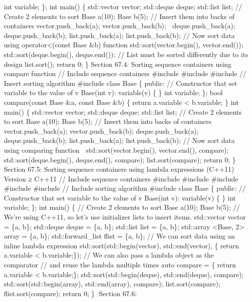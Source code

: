 int variable; \}; int main() \{ std::vector vector; std::deque deque;
std::list list; // Create 2 elements to sort Base a(10); Base b(5); //
Insert them into backs of containers vector.push\_back(a);
vector.push\_back(b);  deque.push\_back(a); deque.push\_back(b);
list.push\_back(a); list.push\_back(b); // Now sort data using
operator\textless(const Base \&b) function std::sort(vector.begin(),
vector.end()); std::sort(deque.begin(), deque.end()); // List must be
sorted differently due to its design list.sort(); return 0; \} Section
67.4: Sorting sequence containers using compare function // Include
sequence containers \#include \#include \#include // Insert sorting
algorithm \#include class Base \{ public: // Constructor that set
variable to the value of v Base(int v): variable(v) \{ \} int variable;
\}; bool compare(const Base \&a, const Base \&b) \{ return a.variable
\textless{} b.variable; \} int main() \{ std::vector vector; std::deque
deque; std::list list; // Create 2 elements to sort Base a(10); Base
b(5); // Insert them into backs of containers vector.push\_back(a);
vector.push\_back(b); deque.push\_back(a); deque.push\_back(b);
list.push\_back(a); list.push\_back(b); // Now sort data using comparing
function  std::sort(vector.begin(), vector.end(), compare);
std::sort(deque.begin(), deque.end(), compare); list.sort(compare);
return 0; \} Section 67.5: Sorting sequence containers using lambda
expressions (C++11) Version ≥ C++11 // Include sequence containers
\#include \#include \#include \#include \#include // Include sorting
algorithm \#include class Base \{ public: // Constructor that set
variable to the value of v Base(int v): variable(v) \{ \} int variable;
\}; int main() \{ // Create 2 elements to sort Base a(10); Base b(5); //
We're using C++11, so let's use initializer lists to insert items.
std::vector vector = \{a, b\}; std::deque deque = \{a, b\}; std::list
list = \{a, b\}; std::array \textless Base, 2\textgreater{} array = \{a,
b\}; std::forward\_list flist = \{a, b\}; // We can sort data using an
inline lambda expression std::sort(std::begin(vector), std::end(vector),
\href{const\%20Base\%20\&a,\%20const\%20Base\%20\&b}{} \{ return
a.variable \textless{} b.variable;\}); // We can also pass a lambda
object as the comparator // and reuse the lambda multiple times auto
compare = \href{const\%20Base\%20\&a,\%20const\%20Base\%20\&b}{} \{
return a.variable \textless{} b.variable;\};
std::sort(std::begin(deque), std::end(deque), compare);
std::sort(std::begin(array), std::end(array), compare);
list.sort(compare); flist.sort(compare); return 0; \} Section 67.6:
